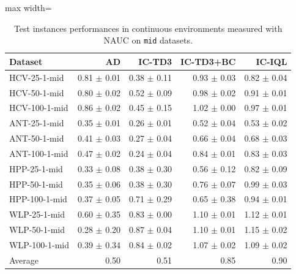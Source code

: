 \documentclass{article}
\begin{document}
\begin{table}[ht]
    \label{tab:}
    \begin{center}
    \caption{Test instances performances in continuous environments measured with NAUC on \texttt{mid} datasets.}
    \begin{small}
    \begin{adjustbox}{max width=\columnwidth}
		\begin{tabular}{l|rrrr}
		\toprule
	\textbf{Dataset} & \textbf{AD} & \textbf{IC-TD3} & \textbf{IC-TD3+BC} & \textbf{IC-IQL}\\
\midrule
HCV-25-1-mid & 0.81 $\pm$ 0.01 & 0.38 $\pm$ 0.11 & 0.93 $\pm$ 0.03 & 0.82 $\pm$ 0.04\\
HCV-50-1-mid & 0.80 $\pm$ 0.02 & 0.52 $\pm$ 0.09 & 0.98 $\pm$ 0.02 & 0.91 $\pm$ 0.01\\
HCV-100-1-mid & 0.86 $\pm$ 0.02 & 0.45 $\pm$ 0.15 & 1.02 $\pm$ 0.00 & 0.97 $\pm$ 0.01\\
ANT-25-1-mid & 0.35 $\pm$ 0.01 & 0.26 $\pm$ 0.01 & 0.52 $\pm$ 0.04 & 0.53 $\pm$ 0.02\\
ANT-50-1-mid & 0.41 $\pm$ 0.03 & 0.27 $\pm$ 0.04 & 0.66 $\pm$ 0.04 & 0.68 $\pm$ 0.03\\
ANT-100-1-mid & 0.47 $\pm$ 0.02 & 0.24 $\pm$ 0.04 & 0.84 $\pm$ 0.01 & 0.83 $\pm$ 0.03\\
HPP-25-1-mid & 0.33 $\pm$ 0.08 & 0.38 $\pm$ 0.30 & 0.56 $\pm$ 0.12 & 0.82 $\pm$ 0.09\\
HPP-50-1-mid & 0.35 $\pm$ 0.06 & 0.38 $\pm$ 0.30 & 0.76 $\pm$ 0.07 & 0.99 $\pm$ 0.03\\
HPP-100-1-mid & 0.37 $\pm$ 0.05 & 0.71 $\pm$ 0.29 & 0.65 $\pm$ 0.38 & 0.94 $\pm$ 0.01\\
WLP-25-1-mid & 0.60 $\pm$ 0.35 & 0.83 $\pm$ 0.00 & 1.10 $\pm$ 0.01 & 1.12 $\pm$ 0.01\\
WLP-50-1-mid & 0.28 $\pm$ 0.20 & 0.87 $\pm$ 0.04 & 1.10 $\pm$ 0.01 & 1.15 $\pm$ 0.02\\
WLP-100-1-mid & 0.39 $\pm$ 0.34 & 0.84 $\pm$ 0.02 & 1.07 $\pm$ 0.02 & 1.09 $\pm$ 0.02\\
\midrule
Average & 0.50 & 0.51 & 0.85 & 0.90\\
\end{tabular}
        \end{adjustbox}
    \end{small}
    \end{center}
    \vskip -0.1in
\end{table}
\end{document}
